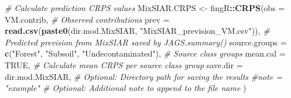 \documentclass[
]{article}
\newenvironment{Shaded}{\begin{snugshade}}{\end{snugshade}}
\newcommand{\AttributeTok}[1]{\textcolor[rgb]{0.13,0.29,0.53}{#1}}
\newcommand{\CommentTok}[1]{\textcolor[rgb]{0.56,0.35,0.01}{\textit{#1}}}
\newcommand{\ConstantTok}[1]{\textcolor[rgb]{0.56,0.35,0.01}{#1}}
\newcommand{\DecValTok}[1]{\textcolor[rgb]{0.00,0.00,0.81}{#1}}
\newcommand{\FunctionTok}[1]{\textcolor[rgb]{0.13,0.29,0.53}{\textbf{#1}}}
\newcommand{\NormalTok}[1]{#1}
\newcommand{\OtherTok}[1]{\textcolor[rgb]{0.56,0.35,0.01}{#1}}
\newcommand{\SpecialCharTok}[1]{\textcolor[rgb]{0.81,0.36,0.00}{\textbf{#1}}}
\newcommand{\StringTok}[1]{\textcolor[rgb]{0.31,0.60,0.02}{#1}}
\begin{document}
\begin{Shaded}
\begin{Highlighting}[]
\CommentTok{\# Calculate prediction CRPS values}
\NormalTok{MixSIAR.CRPS }\OtherTok{\textless{}{-}}\NormalTok{ fingR}\SpecialCharTok{::}\FunctionTok{CRPS}\NormalTok{(}\AttributeTok{obs =}\NormalTok{ VM.contrib,                                                     }\CommentTok{\# Observed contributions}
                            \AttributeTok{prev =} \FunctionTok{read.csv}\NormalTok{(}\FunctionTok{paste0}\NormalTok{(dir.mod.MixSIAR, }\StringTok{"MixSIAR\_prevision\_VM.csv"}\NormalTok{)), }\CommentTok{\# Predicted prevision from MixSIAR saved by \textasciigrave{}JAGS.summary()\textasciigrave{}}
                            \AttributeTok{source.groups =} \FunctionTok{c}\NormalTok{(}\StringTok{"Forest"}\NormalTok{, }\StringTok{"Subsoil"}\NormalTok{, }\StringTok{"Undecontaminated"}\NormalTok{),           }\CommentTok{\# Source class groups}
                            \AttributeTok{mean.cal =} \ConstantTok{TRUE}\NormalTok{,                                                      }\CommentTok{\# Calculate mean CRPS per source class group}
                            \AttributeTok{save.dir =}\NormalTok{ dir.mod.MixSIAR,                                           }\CommentTok{\# Optional: Directory path for saving the results}
                            \CommentTok{\#note = "example"                                                     \# Optional: Additional note to append to the file name}
\NormalTok{                            )}
\end{Highlighting}
\end{Shaded}

\begin{Shaded}
\end{Shaded}
\end{document}
